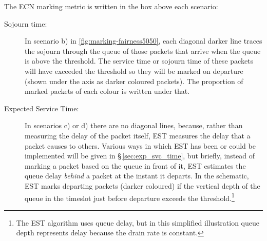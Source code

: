 The ECN marking metric is written in the box above each scenario:
\begin{description}
	\item[Sojourn time:] In scenario b) in \autoref{fig:marking-fairness5050}, each diagonal darker line traces the sojourn through the queue of those packets that arrive when the queue is above the threshold. The service time or sojourn time of these packets will have exceeded the threshold so they will be marked on departure (shown under the axis as darker coloured packets). The proportion of marked packets of each colour is written under that.

	\item[Expected Service Time:] In scenarios c) or d) there are no diagonal lines, because, rather than measuring the delay of the packet itself, EST measures the delay that a packet causes to others. Various ways in which EST has been or could be implemented will be given in \S\,\ref{sec:exp_svc_time}, but briefly, instead of marking a packet based on the queue in front of it, EST estimates the queue delay \textit{behind} a packet at the instant it departs. In the schematic, EST marks departing packets (darker coloured) if the vertical depth of the queue in the timeslot just before departure exceeds the threshold.\footnote{The EST algorithm uses queue delay, but in this simplified illustration queue depth represents delay because the drain rate is constant.}
\end{description}

